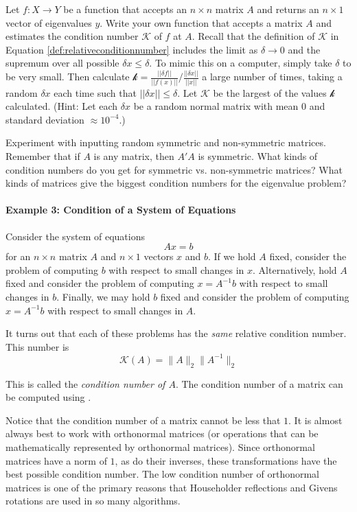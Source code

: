\begin{problem}
Let $f:X\rightarrow Y$ be a function that accepts an $n\times n$ matrix $A$ and returns an $n \times 1$ vector of eigenvalues $y$. Write your own function that accepts a matrix $A$ and estimates the condition number $\mathcal{K}$ of $f$ at $A$. Recall that the definition of $\mathcal{K}$ in Equation \ref{def:relativeconditionnumber} includes the limit as $\delta \rightarrow 0$ and the supremum over all possible $\delta x \leq \delta$. To mimic this on a computer, simply take $\delta$ to be very small. Then calculate $\mathcal{k} =  { \frac{|| \delta f||}{||f(x)||} } / { \frac{|| \delta x||}{||x||} } $ a large number of times, taking a random $\delta x$ each time such that $||\delta x|| \leq \delta$. Let $\mathcal{K}$ be the largest of the values $\mathcal{k}$ calculated. (Hint: Let each $\delta x$ be a random normal matrix with mean $0$ and standard deviation $\approx 10^{-4}$.)

Experiment with inputting random symmetric and non-symmetric matrices. Remember that if $A$ is any matrix, then $A'A$ is symmetric. What kinds of condition numbers do you get for symmetric vs. non-symmetric matrices? What kinds of matrices give the biggest condition numbers for the eigenvalue problem?
\end{problem}

\paragraph{Example 3: Condition of a System of Equations}
Consider the system of equations
\[ Ax = b
\] for an $n \times n$ matrix $A$ and $n \times 1$ vectors $x$ and $b$. If we hold $A$ fixed, consider the problem of computing $b$ with respect to small changes in $x$. Alternatively, hold $A$ fixed and consider the problem of computing $x = A^{-1} b$ with respect to small changes in $b$. Finally, we may hold $b$ fixed and consider the problem of computing $x = A^{-1}b$ with respect to small changes in $A$.

It turns out that each of these problems has the \emph{same} relative condition number. This number is 
\[
\mathcal{K} (A) = \|A\|_2 \|A^{-1}\|_2
\]

This is called the \emph{condition number of $A$}.
The condition number of a matrix can be computed using .

Notice that the condition number of a matrix cannot be less that $1$.
It is almost always best to work with orthonormal matrices (or operations that can be mathematically represented by orthonormal matrices).
Since orthonormal matrices have a norm of $1$, as do their inverses, these transformations have the best possible condition number.
The low condition number of orthonormal matrices is one of the primary reasons that Householder reflections and Givens rotations are used in so many algorithms.

